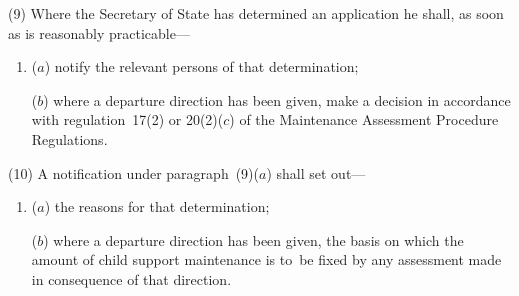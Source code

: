 \documentclass[12pt,a4paper]{article}
\begin{document}
%
%

(9) Where the Secretary of State has determined an application he shall, as soon
as is reasonably practicable—
\begin{enumerate}\item[]
($a$) notify the relevant persons of that determination;

($b$) where a departure direction has been given, 
make a decision in accordance with regulation~17(2) or 20(2)($c$) of the Maintenance Assessment Procedure Regulations.  %
\end{enumerate}

(10) A notification under paragraph~(9)($a$) shall set out—
\begin{enumerate}\item[]
($a$) the reasons for that determination;

($b$) where a departure direction has been given, the basis on which the amount of
child support maintenance is to~be fixed by any assessment made in consequence
of that direction.
\end{enumerate}
\end{document}
